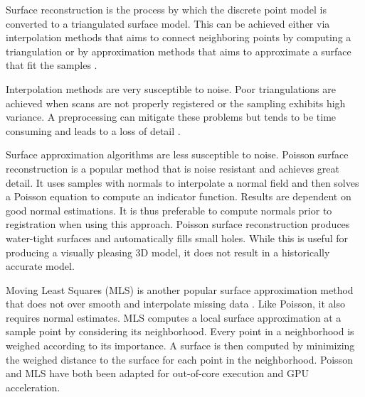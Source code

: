 
Surface reconstruction is the process by which the discrete point model is converted to a triangulated surface model. This can be achieved either via interpolation methods that aims to connect neighboring points by computing a triangulation or by approximation methods that aims to approximate a surface that fit the samples \cite{Schall2005}.

Interpolation methods are very susceptible to noise. Poor triangulations are achieved when scans are not properly registered or the sampling exhibits high variance. A preprocessing can mitigate these problems but tends to be time consuming and leads to a loss of detail \cite{Ruther2011}.

Surface approximation algorithms are less susceptible to noise. Poisson surface reconstruction \cite{Kazhdan2006} is a popular method that is noise resistant and achieves great detail. It uses samples with normals to interpolate a normal field and then solves a Poisson equation to compute an indicator function. Results are dependent on good normal estimations. It is thus preferable to compute normals prior to registration when using this approach. Poisson surface reconstruction produces water-tight surfaces and automatically fills small holes. While this is useful for producing a visually pleasing 3D model, it does not result in a historically accurate model.

Moving Least Squares (MLS) is another popular surface approximation method that does not over smooth and interpolate missing data \cite{Merry2014}. Like Poisson, it also requires normal estimates. MLS computes a local surface approximation at a sample point by considering its neighborhood. Every point in a neighborhood is weighed according to its importance. A surface is then computed by minimizing the weighed distance to the surface for each point in the neighborhood. Poisson and MLS have both been adapted for out-of-core execution and GPU acceleration. 






